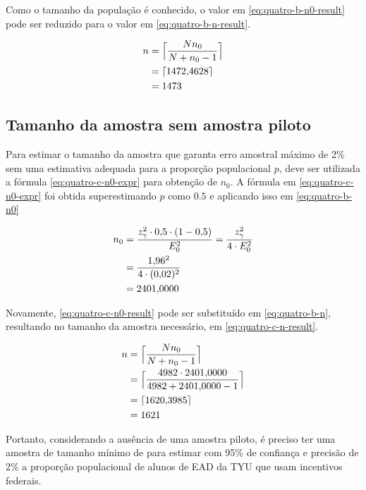 	Como o tamanho da população é conhecido, o valor em
	\eqref{eq:quatro-b-n0-result} pode ser reduzido para o valor em
	\eqref{eq:quatro-b-n-result}.

	\begin{align}
		n &= \Big\lceil \frac{N n_0}{N + n_0 - 1} \nonumber \Big\rceil \\
		  &= \lceil \num{1472.4628} \nonumber \rceil \\
		  &= \label{eq:quatro-b-n-result} 1473
	\end{align}

\subsection{Tamanho da amostra sem amostra piloto}

	Para estimar o tamanho da amostra que garanta erro amostral máximo de
	2\% sem uma estimativa adequada para a proporção populacional $p$, deve
	ser utilizada a fórmula \eqref{eq:quatro-c-n0-expr} para obtenção de
	$n_0$. A fórmula em \eqref{eq:quatro-c-n0-expr} foi obtida
	superestimando $p$ como $\num{0.5}$ e aplicando isso em \eqref{eq:quatro-b-n0}

	\begin{align}
		n_0 &= \label{eq:quatro-c-n0-expr}
			   \frac{z_\gamma^2 \cdot \num{0.5} \cdot (1 - \num{0.5})}{E_0^2} = \frac{z_\gamma^2}{4 \cdot E_0^2} \\
			&= \frac{\num{1.96}^2}{4 \cdot (\num{0.02})^2} \nonumber \\
			&= \label{eq:quatro-c-n0-result}
			   \num{2401.0000}
	\end{align}

	Novamente, \eqref{eq:quatro-c-n0-result} pode ser substituído em
	\eqref{eq:quatro-b-n}, resultando no tamanho da amostra necessário, em
	\eqref{eq:quatro-c-n-result}.

	\begin{align}
		n &= \Big\lceil \frac{N n_0}{N + n_0 - 1} \nonumber \Big\rceil \\
		  &= \Big\lceil \frac{4982 \cdot \num{2401.0000}}{4982 + \num{2401.0000} -1} \nonumber \Big\rceil \\
		  &= \lceil \num{1620.3985} \nonumber \rceil \\
		  &= \label{eq:quatro-c-n-result} 
			 1621
	\end{align}

	Portanto, considerando a ausência de uma amostra piloto, é preciso ter
	uma amostra de tamanho mínimo de \QUATROCnceil para estimar com 95\% de
	confiança e precisão de 2\% a proporção populacional de alunos de EAD da
	TYU que usam incentivos federais.
